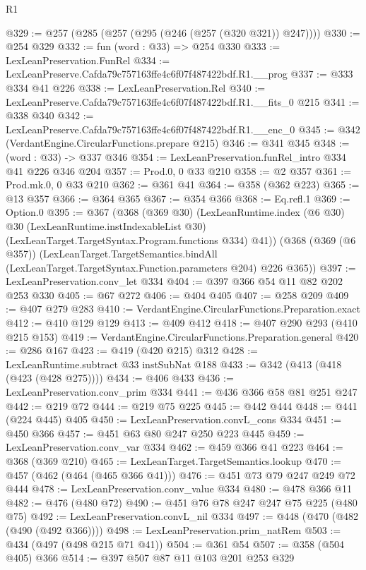 \begin{lexlean}{R1}
\begin{coremodule}
@329 := @257 (@285 (@257 (@295 (@246 (@257 (@320 @321)) @247))))
@330 := @254 @329
@332 := fun (word : @33) => @254 @330
@333 := LexLeanPreservation.FunRel
@334 := LexLeanPreserve.Cafda79c757163ffe4c6f07f487422bdf.R1.__prog
@337 := @333 @334 @41 @226
@338 := LexLeanPreservation.Rel
@340 := LexLeanPreserve.Cafda79c757163ffe4c6f07f487422bdf.R1.__fits_0 @215
@341 := @338 @340
@342 := LexLeanPreserve.Cafda79c757163ffe4c6f07f487422bdf.R1.__enc_0
@345 := @342 (VerdantEngine.CircularFunctions.prepare @215)
@346 := @341 @345
@348 := (word : @33) -> @337 @346
@354 := LexLeanPreservation.funRel_intro @334 @41 @226 @346 @204
@357 := Prod.{0, 0} @33 @210
@358 := @2 @357
@361 := Prod.mk.{0, 0} @33 @210
@362 := @361 @41
@364 := @358 (@362 @223)
@365 := @13 @357
@366 := @364 @365
@367 := @354 @366
@368 := Eq.refl.{1}
@369 := Option.{0}
@395 := @367
    (@368
      (@369 @30)
      (LexLeanRuntime.index
        (@6 @30)
        @30
        (LexLeanRuntime.instIndexableList @30)
        (LexLeanTarget.TargetSyntax.Program.functions @334)
        @41))
    (@368
      (@369 (@6 @357))
      (LexLeanTarget.TargetSemantics.bindAll
        (LexLeanTarget.TargetSyntax.Function.parameters @204)
        @226
        @365))
@397 := LexLeanPreservation.conv_let @334
@404 := @397 @366 @54 @11 @82 @202 @253 @330
@405 := @67 @272
@406 := @404 @405
@407 := @258 @209
@409 := @407 @279 @283
@410 := VerdantEngine.CircularFunctions.Preparation.exact
@412 := @410 @129 @129
@413 := @409 @412
@418 := @407 @290 @293 (@410 @215 @153)
@419 := VerdantEngine.CircularFunctions.Preparation.general
@420 := @286 @167
@423 := @419 (@420 @215) @312
@428 := LexLeanRuntime.subtract @33 instSubNat @188
@433 := @342 (@413 (@418 (@423 (@428 @275))))
@434 := @406 @433
@436 := LexLeanPreservation.conv_prim @334
@441 := @436 @366 @58 @81 @251 @247
@442 := @219 @72
@444 := @219 @75 @225
@445 := @442 @444
@448 := @441 (@224 @445) @405
@450 := LexLeanPreservation.convL_cons @334
@451 := @450 @366
@457 := @451 @63 @80 @247 @250 @223 @445
@459 := LexLeanPreservation.conv_var @334
@462 := @459 @366 @41 @223
@464 := @368 (@369 @210)
@465 := LexLeanTarget.TargetSemantics.lookup
@470 := @457 (@462 (@464 (@465 @366 @41)))
@476 := @451 @73 @79 @247 @249 @72 @444
@478 := LexLeanPreservation.conv_value @334
@480 := @478 @366 @11
@482 := @476 (@480 @72)
@490 := @451 @76 @78 @247 @247 @75 @225 (@480 @75)
@492 := LexLeanPreservation.convL_nil @334
@497 := @448 (@470 (@482 (@490 (@492 @366))))
@498 := LexLeanPreservation.prim_natRem
@503 := @434 (@497 (@498 @215 @71 @41))
@504 := @361 @54
@507 := @358 (@504 @405) @366
@514 := @397 @507 @87 @11 @103 @201 @253 @329

\end{coremodule}
\end{lexlean}
